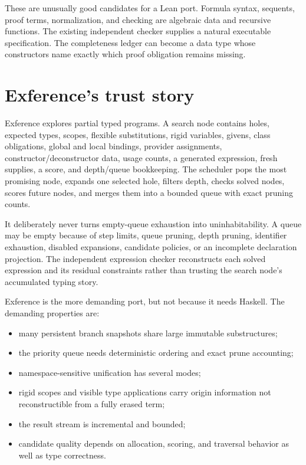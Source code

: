 \documentclass[10pt,letterpaper,oneside]{report}
\begin{document}
These are unusually good candidates for a Lean port. Formula syntax, sequents, proof terms, normalization, and checking are algebraic data and recursive functions. The existing independent checker supplies a natural executable specification. The completeness ledger can become a data type whose constructors name exactly which proof obligation remains missing.

\section{Exference's trust story}

Exference explores partial typed programs. A search node contains holes, expected types, scopes, flexible substitutions, rigid variables, givens, class obligations, global and local bindings, provider assignments, constructor/deconstructor data, usage counts, a generated expression, fresh supplies, a score, and depth/queue bookkeeping. The scheduler pops the most promising node, expands one selected hole, filters depth, checks solved nodes, scores future nodes, and merges them into a bounded queue with exact pruning counts.

It deliberately never turns empty-queue exhaustion into uninhabitability. A queue may be empty because of step limits, queue pruning, depth pruning, identifier exhaustion, disabled expansions, candidate policies, or an incomplete declaration projection. The independent expression checker reconstructs each solved expression and its residual constraints rather than trusting the search node's accumulated typing story.

Exference is the more demanding port, but not because it needs Haskell. The demanding properties are:

\begin{itemize}
  \item many persistent branch snapshots share large immutable substructures;
  \item the priority queue needs deterministic ordering and exact prune accounting;
  \item namespace-sensitive unification has several modes;
  \item rigid scopes and visible type applications carry origin information not reconstructible from a fully erased term;
  \item the result stream is incremental and bounded;
  \item candidate quality depends on allocation, scoring, and traversal behavior as well as type correctness.
\end{itemize}
\end{document}
